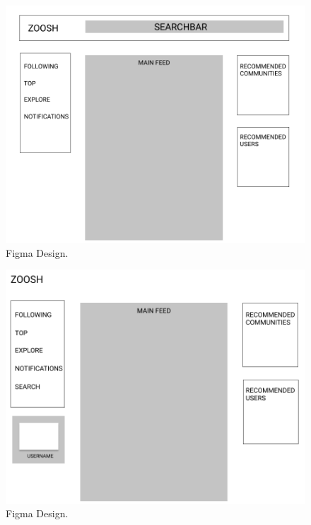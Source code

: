 \begin{figure}[H]
  \centering
  \includegraphics[scale=0.25]{img/FIGMA.PNG}
  \caption{Figma Design.}
  \label{fig:Mock Figma design.}
\end{figure}

\begin{figure}[H]
  \centering
  \includegraphics[scale=0.25]{img/FIGMA2.PNG}
  \caption{Figma Design.}
  \label{fig:Final Figma design.}
\end{figure}

